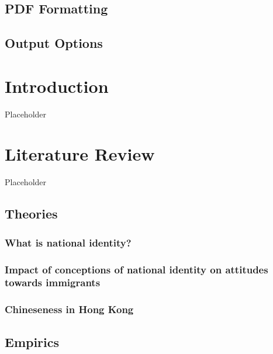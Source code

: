 \documentclass[a4paper, oneside]{report}
\begin{document}
\hypertarget{pdf-formatting}{%
\section{PDF Formatting}\label{pdf-formatting}}

\hypertarget{output-options}{%
\section{Output Options}\label{output-options}}

\hypertarget{intro}{%
\chapter{Introduction}\label{intro}}

Placeholder

\hypertarget{theory}{%
\chapter{Literature Review}\label{theory}}

Placeholder

\hypertarget{theories}{%
\section{Theories}\label{theories}}

\hypertarget{what-is-national-identity}{%
\subsection{What is national
identity?}\label{what-is-national-identity}}

\hypertarget{impact-of-conceptions-of-national-identity-on-attitudes-towards-immigrants}{%
\subsection{Impact of conceptions of national identity on attitudes
towards
immigrants}\label{impact-of-conceptions-of-national-identity-on-attitudes-towards-immigrants}}

\hypertarget{chineseness-in-hong-kong}{%
\subsection{Chineseness in Hong Kong}\label{chineseness-in-hong-kong}}

\hypertarget{empirics}{%
\section{Empirics}\label{empirics}}
\end{document}
